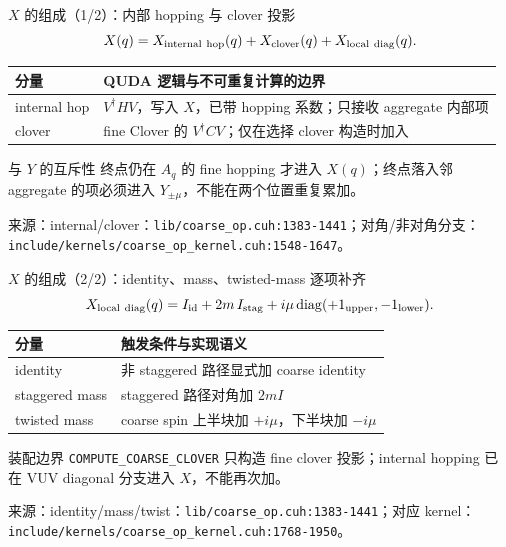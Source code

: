 \documentclass[UTF8,aspectratio=169,11pt]{ctexbeamer}
\newcommand{\source}[1]{\vspace{0.05em}\par{\raggedright\scriptsize\color{muted}来源：#1\par}}
\newcommand{\codepath}[1]{\nolinkurl{#1}}
\begin{document}
\begin{frame}[t]{\(X\) 的组成（1/2）：内部 hopping 与 clover 投影}
  \begin{equation*}
    X(q)=X_{\rm internal\ hop}(q)+X_{\rm clover}(q)+X_{\rm local\ diag}(q).
  \end{equation*}
  \vspace{0.10cm}
  \begin{tabularx}{\textwidth}{@{}lX@{}}
    \toprule
    分量 & QUDA 逻辑与不可重复计算的边界 \\
    \midrule
    internal hop & \(V^\dagger H V\)，写入 \(X\)，已带 hopping 系数；只接收 aggregate 内部项 \\
    clover & fine Clover 的 \(V^\dagger C V\)；仅在选择 clover 构造时加入 \\
    \bottomrule
  \end{tabularx}
  \vspace{0.12cm}
  \begin{block}{与 \(Y\) 的互斥性}
    终点仍在 \(A_q\) 的 fine hopping 才进入 \(X(q)\)；终点落入邻 aggregate 的项必须进入 \(Y_{\pm\mu}\)，不能在两个位置重复累加。
  \end{block}
  \source{internal/clover：\codepath{lib/coarse_op.cuh:1383-1441}；对角/非对角分支：\codepath{include/kernels/coarse_op_kernel.cuh:1548-1647}。}
\end{frame}

\begin{frame}[t]{\(X\) 的组成（2/2）：identity、mass、twisted-mass 逐项补齐}
  \begin{equation*}
    X_{\rm local\ diag}(q)
    =I_{\rm id}+2m\,I_{\rm stag}
      +i\mu\,{\rm diag}(+1_{\rm upper},-1_{\rm lower}).
  \end{equation*}
  \vspace{0.10cm}
  \begin{tabularx}{\textwidth}{@{}lX@{}}
    \toprule
    分量 & 触发条件与实现语义 \\
    \midrule
    identity & 非 staggered 路径显式加 coarse identity \\
    staggered mass & staggered 路径对角加 \(2mI\) \\
    twisted mass & coarse spin 上半块加 \(+i\mu\)，下半块加 \(-i\mu\) \\
    \bottomrule
  \end{tabularx}
  \vspace{0.12cm}
  \begin{alertblock}{装配边界}
    \texttt{COMPUTE\_COARSE\_CLOVER} 只构造 fine clover 投影；internal hopping 已在 VUV diagonal 分支进入 \(X\)，不能再次加。
  \end{alertblock}
  \source{identity/mass/twist：\codepath{lib/coarse_op.cuh:1383-1441}；对应 kernel：\codepath{include/kernels/coarse_op_kernel.cuh:1768-1950}。}
\end{frame}
\end{document}
